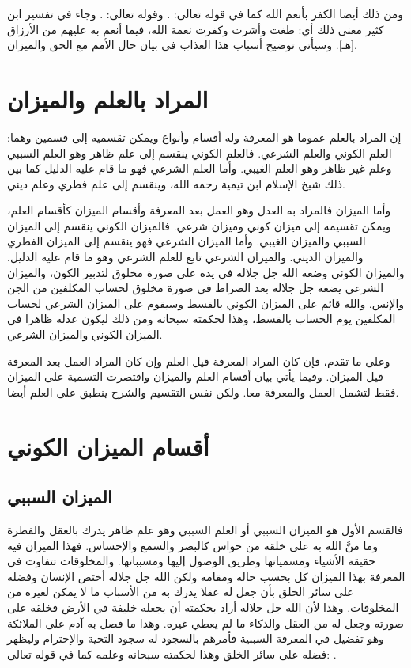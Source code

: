 ومن ذلك أيضا الكفر بأنعم الله كما في قوله تعالى:
\quranayah*[16][112]{\footnotesize \surahname*[16]}. وقوله تعالى:
\quranayah*[28][58]{\footnotesize \surahname*[28]}. وجاء في تفسير ابن كثير معنى ذلك أي: طغت وأشرت وكفرت نعمة الله، فيما أنعم به عليهم من الأرزاق [هـ]. وسيأتي توضيح أسباب هذا العذاب في بيان حال الأمم مع الحق والميزان.

\section{المراد بالعلم والميزان}

إن المراد بالعلم عموما هو المعرفة وله أقسام وأنواع ويمكن تقسميه إلى قسمين وهما: العلم الكوني والعلم الشرعي. فالعلم الكوني ينقسم إلى علم ظاهر وهو العلم السببي وعلم غير ظاهر وهو العلم الغيبي. وأما العلم الشرعي فهو ما قام عليه الدليل كما بين ذلك شيخ الإسلام ابن تيمية رحمه الله، وينقسم إلى علم فطري وعلم ديني.

وأما الميزان فالمراد به العدل وهو العمل بعد المعرفة وأقسام الميزان كأقسام العلم، ويمكن تقسيمه إلى ميزان كوني وميزان شرعي. فالميزان الكوني ينقسم إلى الميزان السببي والميزان الغيبي. وأما الميزان الشرعي فهو ينقسم إلى الميزان الفطري والميزان الديني. والميزان الشرعي تابع للعلم الشرعي وهو ما قام عليه الدليل. والميزان الكوني وضعه الله جل جلاله في يده على صورة مخلوق لتدبير الكون، والميزان الشرعي يضعه جل جلاله بعد الصراط في صورة مخلوق لحساب المكلفين من الجن والإنس. والله قائم على الميزان الكوني بالقسط وسيقوم على الميزان الشرعي لحساب المكلفين يوم الحساب بالقسط، وهذا لحكمته سبحانه ومن ذلك ليكون عدله ظاهرا في الميزان الكوني والميزان الشرعي.

وعلى ما تقدم، فإن كان المراد المعرفة قيل العلم وإن كان المراد العمل بعد المعرفة قيل الميزان. وفيما يأتي بيان أقسام العلم والميزان واقتصرت التسمية على الميزان فقط لتشمل العمل والمعرفة معا. ولكن نفس التقسيم والشرح ينطبق على العلم أيضا.

\section{أقسام الميزان الكوني}

\subsection{الميزان السببي}

فالقسم الأول هو الميزان السببي أو العلم السببي وهو علم ظاهر يدرك بالعقل والفطرة وما منَّ الله به على خلقه من حواس كالبصر والسمع والإحساس. فهذا الميزان فيه حقيقة الأشياء ومسمياتها وطريق الوصول إليها ومسبباتها. والمخلوقات تتفاوت في المعرفة بهذا الميزان كل بحسب حاله ومقامه ولكن الله جل جلاله أختص الإنسان وفضله على سائر الخلق بأن جعل له عقلا يدرك به من الأسباب ما لا يمكن لغيره من المخلوقات. وهذا لأن الله جل جلاله أراد بحكمته أن يجعله خليفة في الأرض فخلقه على صورته وجعل له من العقل والذكاء ما لم يعطي غيره. وهذا ما فضل به آدم على الملائكة وهو تفضيل في المعرفة السببية فأمرهم بالسجود له سجود التحية والإحترام وليظهر فضله على سائر الخلق وهذا لحكمته سبحانه وعلمه كما في قوله تعالى:
\quranayah*[2][30-34]{\footnotesize \surahname*[2]}.

